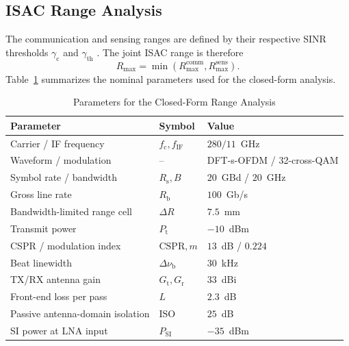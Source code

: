 \documentclass[10pt,journal]{IEEEtran}
\begin{document}
\subsection{ISAC Range Analysis}
\label{sec:isac_range}

The communication and sensing ranges are defined by their respective
SINR thresholds $\gamma_{\mathrm c}$ and $\gamma_{\mathrm{th}}$
\cite{sturm_waveform_2011}. The joint ISAC range is therefore
\begin{equation}
R_{\max}
=
\min\!\left(
R_{\max}^{\mathrm{comm}},
R_{\max}^{\mathrm{sens}}
\right).
\label{eq:rmax}
\end{equation}
Table~\ref{tab:simulation_parameters} summarizes the nominal parameters
used for the closed-form analysis.

\begin{table}[!t]
\caption{Parameters for the Closed-Form Range Analysis}
\label{tab:simulation_parameters}
\centering
\footnotesize
\renewcommand{\arraystretch}{1.07}
\setlength{\tabcolsep}{2.5pt}
\begin{tabular}{@{}
>{\raggedright\arraybackslash}p{}
>{\centering\arraybackslash}p{}
>{\raggedleft\arraybackslash}p{}
@{}}
\toprule
Parameter & Symbol & Value \\
\midrule
Carrier / IF frequency
    & $f_{\mathrm c},f_{\mathrm{IF}}$
    & $280/11$~GHz \\
Waveform / modulation
    & --
    & DFT-s-OFDM / 32-cross-QAM \\
Symbol rate / bandwidth
    & $R_{\mathrm s},B$
    & $20$~GBd / $20$~GHz \\
Gross line rate
    & $R_{\mathrm b}$
    & $100$~Gb/s \\
Bandwidth-limited range cell
    & $\Delta R$
    & $7.5$~mm \\
Transmit power
    & $P_{\mathrm t}$
    & $-10$~dBm \\
CSPR / modulation index
    & $\mathrm{CSPR},m$
    & $13$~dB / $0.224$ \\
Beat linewidth
    & $\Delta\nu_{\mathrm b}$
    & $30$~kHz \\
TX/RX antenna gain
    & $G_{\mathrm t},G_{\mathrm r}$
    & $33$~dBi \\
Front-end loss per pass
    & $L$
    & $2.3$~dB \\
Passive antenna-domain isolation
    & $\mathrm{ISO}$
    & $25$~dB \\
SI power at LNA input
    & $P_{\mathrm{SI}}$
    & $-35$~dBm \\

\end{tabular}
\end{table}
\end{document}
